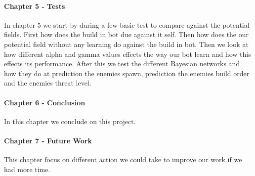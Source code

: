 \paragraph*{Chapter 5 - Tests}
In chapter 5 we start by during a few basic test to compare against the potential fields. First how does the build in bot due against it self. Then how does the our potential field without any learning do against the build in bot. Then we look at how different alpha and gamma values effects the way our bot learn and how this effects its performance. After this we test the different Bayesian networks and how they do at prediction the enemies spawn, prediction the enemies build order and the enemies threat level.

\paragraph*{Chapter 6 - Conclusion}
In this chapter we conclude on this project.

\paragraph*{Chapter 7 - Future Work}
This chapter focus on different action we could take to improve our work if we had more time.
